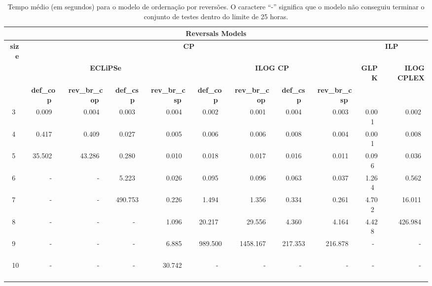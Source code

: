 \begin{sidewaystable}[!ht]
  \caption{Tempo médio (em segundos) para o modelo de ordernação por reversões. O caractere ``-'' significa que o modelo não conseguiu terminar o conjunto de testes dentro do limite de 25 horas.}
  \label{table:rev}
  \begin{center}
    \begin{tabular}{| r | r | r | r | r | r | r | r | r | r | r |}
      \hline
      \multicolumn{11}{|c|}{\textbf{Reversals Models}} \\
      \hline
      \textbf{size} & \multicolumn{8}{|c|}{\textbf{CP}} & \multicolumn{2}{|c|}{\textbf{ILP}} \\
      \cline{02-11}
        & \multicolumn{4}{|c|}{\textbf{ECLiPSe}} & \multicolumn{4}{|c|}{\textbf{ILOG CP}} & \textbf{GLPK} & \textbf{ILOG CPLEX}  \\
      \cline{02-09}
        & \textbf{~def\_cop~} & \textbf{~rev\_br\_cop~} & \textbf{~def\_csp~} & \textbf{~rev\_br\_csp~} & \textbf{~def\_cop~} & \textbf{~rev\_br\_cop~} & \textbf{~def\_csp~} & \textbf{~rev\_br\_csp~}  & & \\
      \hline
      ~3~ & ~0.009~ & ~0.004~ & ~0.003~ & ~0.004~ & ~0.002~ & ~0.001~ & ~0.004~ & ~0.003~ & ~0.001~ & ~0.002~ \\
      ~4~ & ~0.417~ & ~0.409~ & ~0.027~ & ~0.005~ & ~0.006~ & ~0.006~ & ~0.008~ & ~0.004~ & ~0.001~ & ~0.008~ \\
      ~5~ & ~35.502~ & ~43.286~ & ~0.280~ & ~0.010~ & ~0.018~ & ~0.017~ & ~0.016~ & ~0.011~ & ~0.096~ & ~0.036~ \\
      ~6~ & ~-~ & ~-~ & ~5.223~ & ~0.026~ & ~0.095~ & ~0.096~ & ~0.063~ & ~0.037~ & ~1.264~ & ~0.562~ \\
      ~7~ & ~-~ & ~-~ & ~490.753~ & ~0.226~ & ~1.494~ & ~1.356~ & ~0.334~ & ~0.261~ & ~4.702~ & ~16.011~ \\
      ~8~ & ~-~ & ~-~ & ~-~ & ~1.096~ & ~20.217~ & ~29.556~ & ~4.360~ & ~4.164~ & ~4.428~ & ~426.984~ \\
      ~9~ & ~-~ & ~-~ & ~-~ & ~6.885~ & ~989.500~ & ~1458.167~ & ~217.353~ & ~216.878~ & ~-~ & ~-~ \\
      ~10~ & ~-~ & ~-~ & ~-~ & ~30.742~ & ~-~ & ~-~ & ~-~ & ~-~ & ~-~ & ~-~ \\
      \hline
    \end{tabular}
  \end{center}
\end{sidewaystable}
